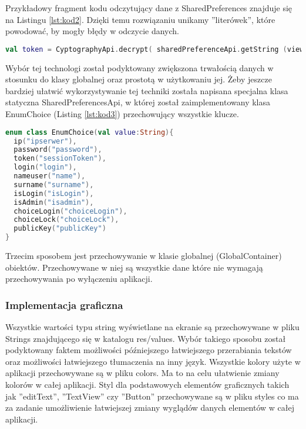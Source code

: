 	Przykładowy fragment kodu odczytujący dane z SharedPreferences znajduje się na Listingu \ref{lst:kod2}. Dzięki temu rozwiązaniu unikamy ''literówek'', które powodować, by mogły błędy w odczycie danych. 
		
	\begin{lstlisting}[caption={Fragment kodu odpowiedzialny za odczytanie tokenu}, label={lst:kod2}, language=Kotlin]
val token = CyptographyApi.decrypt( sharedPreferenceApi.getString (view, EnumChoice.token))
	\end{lstlisting}
	
	Wybór tej technologi został podyktowany zwiększona trwałością danych w stosunku do klasy globalnej oraz prostotą w użytkowaniu jej. Żeby jeszcze bardziej ułatwić wykorzystywanie tej techniki została napisana specjalna klasa statyczna SharedPreferencesApi, w której został zaimplementowany klasa EnumChoice \linebreak (Listing \ref{lst:kod3}) przechowujący wszystkie klucze.
	
		\begin{lstlisting}[caption={klasa EnumChoice.}, label={lst:kod3}, language=Kotlin]
enum class EnumChoice(val value:String){
  ip("ipserwer"),
  password("password"),
  token("sessionToken"),
  login("login"), 
  nameuser("name"), 
  surname("surname"),
  isLogin("isLogin"), 
  isAdmin("isadmin"),
  choiceLogin("choiceLogin"), 
  choiceLock("choiceLock"),
  publicKey("publicKey")
}
		\end{lstlisting}
		
	Trzecim sposobem jest przechowywanie w klasie globalnej (GlobalContainer)  obiektów. Przechowywane w niej są wszystkie dane które nie wymagają przechowywania po wyłączeniu aplikacji.
		
	\subsubsection{Implementacja graficzna}
		
	Wszystkie wartości typu string wyświetlane na ekranie są przechowywane w pliku Strings znajdującego się w katalogu res/values. Wybór takiego sposobu został podyktowany faktem możliwości późniejszego łatwiejszego przerabiania tekstów oraz możliwości łatwiejszego tłumaczenia na inny język. Wszystkie kolory użyte w aplikacji przechowywane są w pliku colors. Ma to na celu ułatwienie  zmiany kolorów w całej aplikacji. Styl dla podstawowych elementów graficznych takich jak ''editText'', ''TextView'' czy ''Button'' przechowywane są w pliku styles co ma za zadanie umożliwienie łatwiejszej zmiany wyglądów danych elementów w całej aplikacji.
		
